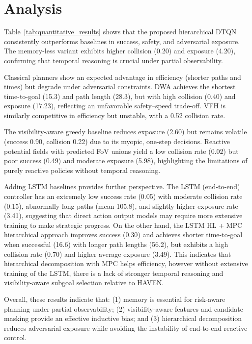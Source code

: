 \documentclass[letterpaper, 10 pt, conference]{ieeeconf}
\begin{document}
\section{Analysis}
Table~\ref{tab:quantitative_results} shows that the proposed hierarchical DTQN consistently outperforms baselines in success, safety, and adversarial exposure. The memory-less variant exhibits higher collision (0.20) and exposure (4.20), confirming that temporal reasoning is crucial under partial observability.  

Classical planners show an expected advantage in efficiency (shorter paths and times) but degrade under adversarial constraints. DWA achieves the shortest time-to-goal (15.3) and path length (28.3), but with high collision (0.40) and exposure (17.23), reflecting an unfavorable safety–speed trade-off. VFH is similarly competitive in efficiency but unstable, with a 0.52 collision rate.  

The visibility-aware greedy baseline reduces exposure (2.60) but remains volatile (success 0.90, collision 0.22) due to its myopic, one-step decisions. Reactive potential fields with predicted FoV unions yield a low collision rate (0.02) but poor success (0.49) and moderate exposure (5.98), highlighting the limitations of purely reactive policies without temporal reasoning.  

Adding LSTM baselines provides further perspective. The LSTM (end-to-end) controller has an extremely low success rate (0.05) with moderate collision rate (0.15), abnormally long paths (mean 105.8), and slightly higher exposure rate (3.41), suggesting that direct action output models may require more extensive training to make strategic progress. On the other hand, the LSTM HL + MPC hierarchical approach improves success (0.30) and achieves shorter time-to-goal when successful (16.6) with longer path lengths (56.2), but exhibits a high collision rate (0.70) and higher average exposure (3.49). This indicates that hierarchical decomposition with MPC helps efficiency, however without extensive training of the LSTM, there is a lack of stronger temporal reasoning and visibility-aware subgoal selection relative to HAVEN.

Overall, these results indicate that:  
(1) memory is essential for risk-aware planning under partial observability;  
(2) visibility-aware features and candidate masking provide an effective inductive bias; and  
(3) hierarchical decomposition reduces adversarial exposure while avoiding the instability of end-to-end reactive control.  
\end{document}
